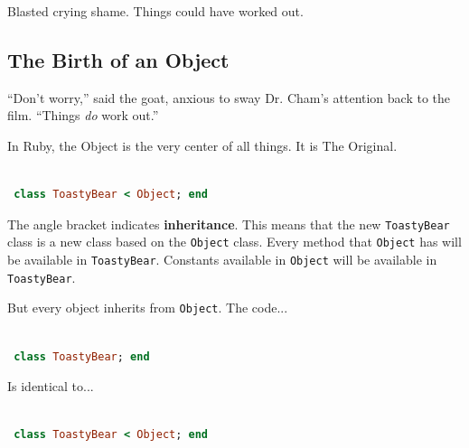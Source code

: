 \documentclass[10pt,twoside]{report}
\begin{document}
Blasted crying shame.  Things could have worked out.



\subsection{The Birth of an Object}



``Don't worry,'' said the goat, anxious to sway Dr. Cham's attention
back to the film.  ``Things {\em do} work out.''

In Ruby, the Object is the very center of all things.  It is The
Original.


\begin{lstlisting}[basicstyle=\ttfamily\color{basiccolor},
    commentstyle = \ttfamily\color{commentcolor},
    keywordstyle=\ttfamily\color{keywordscolor},
    stringstyle=\color{stringcolor},
    language=Ruby,
    basicstyle=\small\ttfamily,
    showstringspaces=false,
  ]

 class ToastyBear < Object; end

\end{lstlisting}


The angle bracket indicates {\bf inheritance}.  This means that the
new \lstinline[breaklines=true]|ToastyBear| class is a new class based
on the \lstinline[breaklines=true]|Object| class.  Every method that
\lstinline[breaklines=true]|Object| has will be available in
\lstinline[breaklines=true]|ToastyBear|.  Constants available in
\lstinline[breaklines=true]|Object| will be available in
\lstinline[breaklines=true]|ToastyBear|.

But every object inherits from \lstinline[breaklines=true]|Object|.
The code...


\begin{lstlisting}[basicstyle=\ttfamily\color{basiccolor},
    commentstyle = \ttfamily\color{commentcolor},
    keywordstyle=\ttfamily\color{keywordscolor},
    stringstyle=\color{stringcolor},
    language=Ruby,
    basicstyle=\small\ttfamily,
    showstringspaces=false,
  ]

 class ToastyBear; end

\end{lstlisting}


Is identical to...


\begin{lstlisting}[basicstyle=\ttfamily\color{basiccolor},
    commentstyle = \ttfamily\color{commentcolor},
    keywordstyle=\ttfamily\color{keywordscolor},
    stringstyle=\color{stringcolor},
    language=Ruby,
    basicstyle=\small\ttfamily,
    showstringspaces=false,
  ]

 class ToastyBear < Object; end

\end{lstlisting}
\end{document}
